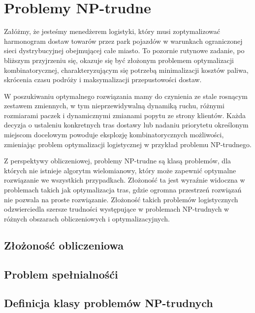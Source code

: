 \chapter{Problemy NP-trudne}

Załóżmy, że jesteśmy menedżerem logistyki, który musi zoptymalizować harmonogram dostaw towarów przez park pojazdów w warunkach ograniczonej sieci dystrybucyjnej obejmującej całe miasto. To pozornie rutynowe zadanie, po bliższym przyjrzeniu się, okazuje się być złożonym problemem optymalizacji kombinatorycznej, charakteryzującym się potrzebą minimalizacji kosztów paliwa, skrócenia czasu podróży i maksymalizacji przepustowości dostaw.

W poszukiwaniu optymalnego rozwiązania mamy do czynienia ze stale rosnącym zestawem zmiennych, w tym nieprzewidywalną dynamiką ruchu, różnymi rozmiarami paczek i dynamicznymi zmianami popytu ze strony klientów. Każda decyzja o ustaleniu konkretnych tras dostawy lub nadaniu priorytetu określonym miejscom docelowym powoduje eksplozję kombinatorycznych możliwości, zmieniając problem optymalizacji logistycznej w przykład problemu NP-trudnego.

Z perspektywy obliczeniowej, problemy NP-trudne są klasą problemów, dla których nie istnieje algorytm wielomianowy, który może zapewnić optymalne rozwiązanie we wszystkich przypadkach. Złożoność ta jest wyraźnie widoczna w problemach takich jak optymalizacja tras, gdzie ogromna przestrzeń rozwiązań nie pozwala na proste rozwiązanie. Złożoność takich problemów logistycznych odzwierciedla szersze trudności występujące w problemach NP-trudnych w różnych obszarach obliczeniowych i optymalizacyjnych.

\section{Złożoność obliczeniowa}

\section{Problem spełnialnośći}

\section{Definicja klasy problemów NP-trudnych}




